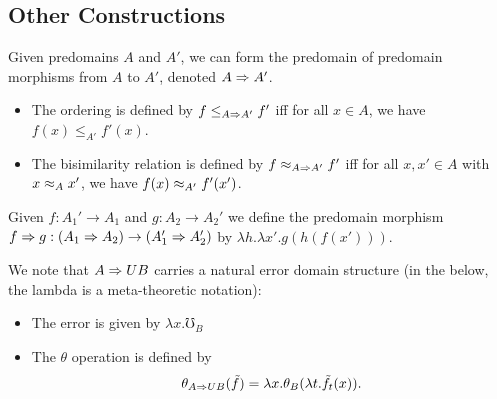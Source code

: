 





\subsection{Other Constructions}
Given predomains $A$ and $A'$, we can form the predomain of
predomain morphisms from $A$ to $A'$, denoted $A \Rightarrow A'$.
\begin{itemize}
    \item The ordering is defined by $f \le_{A \Rightarrow A'} f'$ iff for all
    $x \in A$, we have $f(x) \le_{A'} f'(x)$.
    \item The bisimilarity relation is defined by $f \approx_{A \Rightarrow A'} f'$ iff
    for all $x, x' \in A$ with $x \approx_{A} x'$, we have $f(x) \approx_{A'} f'(x')$. 
\end{itemize}
%
Given $f : A_1' \to A_1$ and $g : A_2 \to A_2'$ we define the predomain morphism
$f \Rightarrow g : (A_1 \Rightarrow A_2) \to (A_1' \Rightarrow A_2')$ by $\lambda h. \lambda x'. g(h(f(x')))$.



We note that $A \Rightarrow UB$ carries a natural error domain structure
(in the below, the lambda is a meta-theoretic notation):
\begin{itemize}
    \item The error is given by $\lambda x . \mho_B$
    \item The $\theta$ operation is defined by
      \[ \theta_{A \Rightarrow UB}(\tilde{f}) = \lambda x . \theta_B(\lambda t . \tilde{f}_t(x)). \]
\end{itemize}

